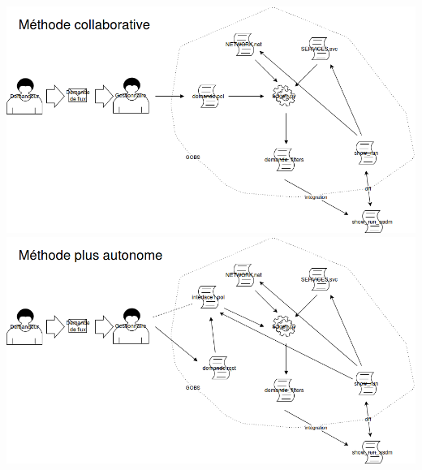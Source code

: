 \documentclass{article}
\begin{document}
\includegraphics[scale=0.4]{collaborative.png}
\includegraphics[scale=0.4]{autonome.png}
\end{document}
